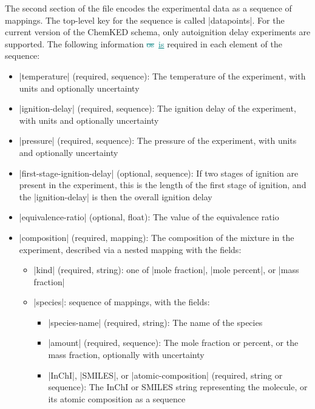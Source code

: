 \documentclass[12pt]{ijck}
\newcommand\ck{ChemKED}
\newcommand{\addone}[1]{{\sloppy\textcolor{teal}{\uline{#1}}}}  %
\newcommand{\deleteone}[1]{\sloppy\textcolor{teal}{\sout{#1}}}    %
\begin{document}
The second section of the file encodes the experimental data as a sequence of mappings. The
top-level key for the sequence is called \yabox|datapoints|. For the current version of the \ck{}
schema, only autoignition delay experiments are supported. The following information
\deleteone{os}~\addone{is} required in each element of the sequence:
%
\begin{itemize}
    \item \yabox|temperature| (required, sequence): The temperature of the
    experiment, with units and optionally uncertainty
    \item \yabox|ignition-delay| (required, sequence): The ignition delay of the
    experiment, with units and optionally uncertainty
    \item \yabox|pressure| (required, sequence): The pressure of the experiment,
    with units and optionally uncertainty
    \item \yabox|first-stage-ignition-delay| (optional, sequence): If two stages of ignition are
    present in the experiment, this is the length of the first stage of ignition, and the
    \yabox|ignition-delay| is then the overall ignition delay
    \item \yabox|equivalence-ratio| (optional, float): The value of the equivalence ratio
    \item \yabox|composition| (required, mapping): The composition of the
    mixture in the experiment, described via a nested mapping with the fields:
    \begin{itemize}
        \item \yabox|kind| (required, string): one of \yabox|mole fraction|, \yabox|mole percent|, or \yabox|mass fraction|
        \item \yabox|species|: sequence of mappings, with the fields:
        \begin{itemize}
            \item \yabox|species-name| (required, string): The name of the species
            \item \yabox|amount| (required, sequence): The mole fraction or percent, or the mass fraction, optionally with uncertainty
            \item \yabox|InChI|, \yabox|SMILES|, or \yabox|atomic-composition|
            (required, string or sequence): The InChI
            or SMILES string representing the molecule, or its atomic
            composition as a sequence
        \end{itemize}
    \end{itemize}

\end{itemize}
\end{document}
